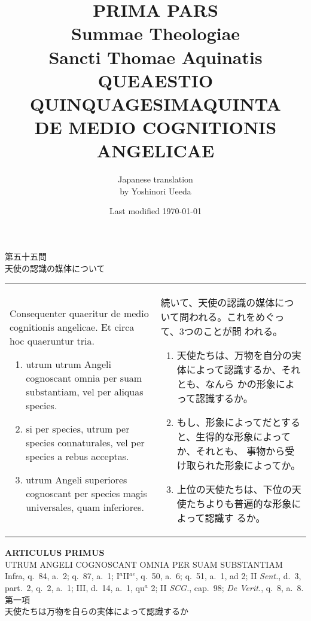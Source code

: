\documentclass[10pt]{jsarticle} %
\title{{\bf PRIMA PARS}\\{\HUGE Summae Theologiae}\\Sancti Thomae
Aquinatis\\{\sffamily QUEAESTIO QUINQUAGESIMAQUINTA}\\DE MEDIO COGNITIONIS ANGELICAE}
\author{Japanese translation\\by Yoshinori {\sc Ueeda}}
\date{Last modified \today}
\begin{document}
\maketitle
\pagestyle{fancy}

\begin{center}
{\Large 第五十五問\\天使の認識の媒体について}
\end{center}

\begin{longtable}{p{21em}p{21em}}

Consequenter quaeritur de medio cognitionis angelicae. Et circa hoc
 quaeruntur tria. 
\begin{enumerate}
 \item utrum utrum Angeli cognoscant omnia per suam substantiam, vel per
       aliquas species.
 \item si per species, utrum per species connaturales, vel per species a
       rebus acceptas.
 \item utrum Angeli superiores cognoscant per species magis universales,
       quam inferiores.
\end{enumerate}

&

続いて、天使の認識の媒体について問われる。これをめぐって、3つのことが問
 われる。

\begin{enumerate}
 \item 天使たちは、万物を自分の実体によって認識するか、それとも、なんら
       かの形象によって認識するか。
 \item もし、形象によってだとすると、生得的な形象によってか、それとも、
       事物から受け取られた形象によってか。
 \item 上位の天使たちは、下位の天使たちよりも普遍的な形象によって認識す
       るか。
\end{enumerate}

\end{longtable}
\newpage


\begin{center}
 {\Large {\bf ARTICULUS PRIMUS}}\\
 {\large UTRUM ANGELI COGNOSCANT OMNIA PER SUAM SUBSTANTIAM}\\
 {\footnotesize Infra, q.~84, a.~2; q.~87, a.~1; I$^a$II$^{ae}$, q.~50,
 a.~6; q.~51, a.~1, ad 2; II {\itshape Sent.}, d.~3, part.~2, q.~2,
 a.~1; III, d.~14, a.~1, qu$^a$ 2; II {\itshape SCG.}, cap.~98;
 {\itshape De Verit.}, q.~8, a.~8.}\\
 {\Large 第一項\\天使たちは万物を自らの実体によって認識するか}
\end{center}
\end{document}
